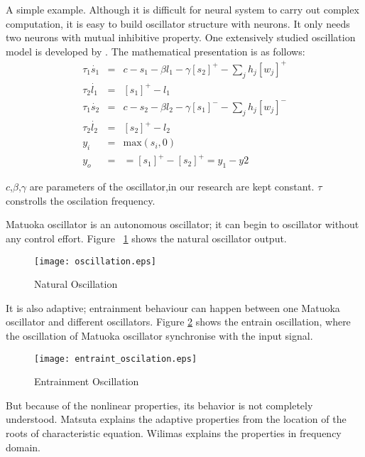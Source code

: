 A simple example.
Although it is difficult for neural system to carry out complex computation, it is easy to build oscillator structure with neurons. 
It only needs two neurons with mutual inhibitive property.
One extensively studied oscillation model is developed by \citet{neurooscillation}. 
The mathematical presentation is as follows:
\begin{eqnarray}
\tau_{1} \dot{s_{1}}&=&c-s_{1}-\beta l_{1}-\gamma [s_{2}]^{+}-\sum_{j}h_{j}[w_{j}]^{+}\\
\tau_{2} \dot{l_{1}}&=&[s_{1}]^{+}-l_{1}\\
\tau_{1} \dot{s_{2}}&=&c-s_{2}-\beta l_{2}-\gamma [s_{1}]^{-}-\sum_{j}h_{j}[w_{j}]^{-}\\
\tau_{2} \dot{l_{2}}&=&[s_{2}]^{+}-l_{2}\\
y_{i}&=&\mbox{max}(s_{i},0)\\
y_{o}&=&=[s_{1}]^{+}-[s_{2}]^{+}=y_{1}-y{2}
\label{eq:matsuta}
\end{eqnarray}

$c$,$\beta$,$\gamma$ are parameters of the oscillator,in our research are kept constant.
$\tau$ constrolls the oscilation frequency.







Matuoka oscillator is an autonomous oscillator; 
it can begin to oscillator without any control effort.
Figure ~\ref{fig:natural-oscilation} shows the natural oscillator output.
\begin{figure}[h]
\texttt{[image: oscillation.eps]}
\caption{Natural Oscillation}
\label{fig:natural-oscilation}
\end{figure}





It is also adaptive; entrainment behaviour can happen between one Matuoka oscillator and different oscillators. 
Figure \ref{fig:entraint-oscilation} shows the entrain oscillation,
where the oscillation of Matuoka oscillator synchronise with the input signal.
\begin{figure}[h]
\texttt{[image: entraint\_oscilation.eps]}
\caption{Entrainment Oscillation}
\label{fig:entraint-oscilation}
\end{figure}

But because of the nonlinear properties, its behavior is not completely understood. 
Matsuta\citep{Matsuoka1987} explains the adaptive properties from the location of the roots of  characteristic equation. 
Wilimas\citep{Williamson1998} explains the properties in frequency domain.



